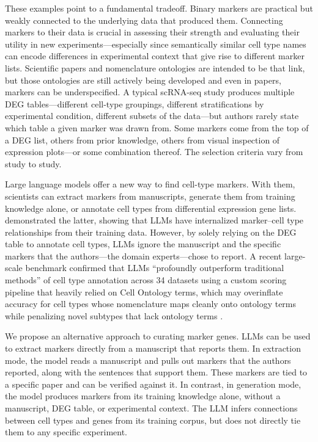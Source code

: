 \documentclass[10pt,twocolumn]{article}
\theoremstyle{plain}
\theoremstyle{definition}
\theoremstyle{remark}
\begin{document}
These examples point to a fundamental tradeoff. Binary markers are practical but weakly connected to the underlying data that produced them. Connecting markers to their data is crucial in assessing their strength and evaluating their utility in new experiments---especially since semantically similar cell type names can encode differences in experimental context that give rise to different marker lists. Scientific papers and nomenclature ontologies are intended to be that link, but those ontologies are still actively being developed \citep{tan2026cellontologyagesinglecell} and even in papers, markers can be underspecified. A typical scRNA-seq study produces multiple DEG tables---different cell-type groupings, different stratifications by experimental condition, different subsets of the data---but authors rarely state which table a given marker was drawn from. Some markers come from the top of a DEG list, others from prior knowledge, others from visual inspection of expression plots---or some combination thereof. The selection criteria vary from study to study.

Large language models offer a new way to find cell-type markers. With them, scientists can extract markers from manuscripts, generate them from training knowledge alone, or annotate cell types from differential expression gene lists. \citep{Hou_2024} demonstrated the latter, showing that LLMs have internalized marker--cell type relationships from their training data. However, by solely relying on the DEG table to annotate cell types, LLMs ignore the manuscript and the specific markers that the authors---the domain experts---chose to report. A recent large-scale benchmark confirmed that LLMs ``profoundly outperform traditional methods'' of cell type annotation across 34 datasets using a custom scoring pipeline that heavily relied on Cell Ontology terms, which may overinflate accuracy for cell types whose nomenclature maps cleanly onto ontology terms while penalizing novel subtypes that lack ontology terms \citep{Xiao_2025}. 

We propose an alternative approach to curating marker genes. LLMs can be used to extract markers directly from a manuscript that reports them. In extraction mode, the model reads a manuscript and pulls out markers that the authors reported, along with the sentences that support them. These markers are tied to a specific paper and can be verified against it. In contrast, in generation mode, the model produces markers from its training knowledge alone, without a manuscript, DEG table, or experimental context. The LLM infers connections between cell types and genes from its training corpus, but does not directly tie them to any specific experiment.
\end{document}
